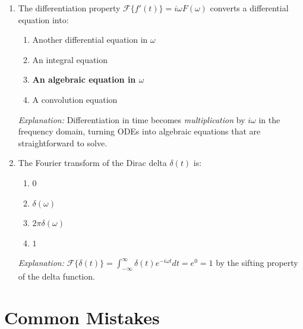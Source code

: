 \documentclass[12pt,a4paper]{article}
\begin{document}
\begin{enumerate}[label=\textbf{MCQ \arabic*.}, leftmargin=3em]
\item The differentiation property $\mathcal{F}\{f'(t)\} = i\omega F(\omega)$ converts a differential equation into:

\begin{enumerate}[label=(\alph*)]
  \item Another differential equation in $\omega$
  \item An integral equation
  \item \textbf{An algebraic equation in $\omega$}
  \item A convolution equation
\end{enumerate}
\textit{Explanation:} Differentiation in time becomes \emph{multiplication} by $i\omega$ in the frequency domain, turning ODEs into algebraic equations that are straightforward to solve.

\item The Fourier transform of the Dirac delta $\delta(t)$ is:

\begin{enumerate}[label=(\alph*)]
  \item $0$
  \item $\delta(\omega)$
  \item $2\pi\delta(\omega)$
  \item \textbf{$1$}
\end{enumerate}
\textit{Explanation:} $\mathcal{F}\{\delta(t)\} = \int_{-\infty}^{\infty}\delta(t)e^{-i\omega t}dt = e^{0} = 1$ by the sifting property of the delta function.

\end{enumerate}

\section{Common Mistakes}
\end{document}
